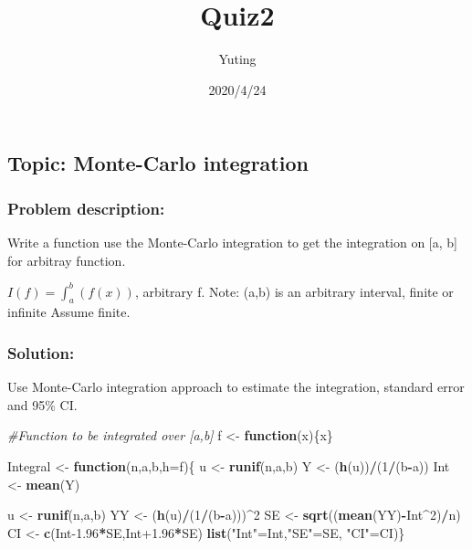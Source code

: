 \documentclass[
]{article}
\title{Quiz2}
\author{Yuting}
\date{2020/4/24}
\newenvironment{Shaded}{\begin{snugshade}}{\end{snugshade}}
\newcommand{\CommentTok}[1]{\textcolor[rgb]{0.56,0.35,0.01}{\textit{#1}}}
\newcommand{\ControlFlowTok}[1]{\textcolor[rgb]{0.13,0.29,0.53}{\textbf{#1}}}
\newcommand{\DataTypeTok}[1]{\textcolor[rgb]{0.13,0.29,0.53}{#1}}
\newcommand{\DecValTok}[1]{\textcolor[rgb]{0.00,0.00,0.81}{#1}}
\newcommand{\FloatTok}[1]{\textcolor[rgb]{0.00,0.00,0.81}{#1}}
\newcommand{\KeywordTok}[1]{\textcolor[rgb]{0.13,0.29,0.53}{\textbf{#1}}}
\newcommand{\NormalTok}[1]{#1}
\newcommand{\OperatorTok}[1]{\textcolor[rgb]{0.81,0.36,0.00}{\textbf{#1}}}
\newcommand{\StringTok}[1]{\textcolor[rgb]{0.31,0.60,0.02}{#1}}
\begin{document}
\maketitle

{
\setcounter{tocdepth}{2}
\tableofcontents
}
\hypertarget{topic-monte-carlo-integration}{%
\subsection{Topic: Monte-Carlo
integration}\label{topic-monte-carlo-integration}}

\hypertarget{problem-description}{%
\subsubsection{Problem description:}\label{problem-description}}

Write a function use the Monte-Carlo integration to get the integration
on {[}a, b{]} for arbitray function.

\(I(f)=\int_{a}^{b}(f(x))\), arbitrary f. Note: (a,b) is an arbitrary
interval, finite or infinite Assume finite.

\hypertarget{solution}{%
\subsubsection{Solution:}\label{solution}}

Use Monte-Carlo integration approach to estimate the integration,
standard error and 95\% CI.

\begin{Shaded}
\begin{Highlighting}[]
\CommentTok{#Function to be integrated over [a,b]}
\NormalTok{f <-}\StringTok{ }\ControlFlowTok{function}\NormalTok{(x)\{x\} }

\NormalTok{Integral <-}\StringTok{ }\ControlFlowTok{function}\NormalTok{(n,a,b,}\DataTypeTok{h=}\NormalTok{f)\{}
\NormalTok{u <-}\StringTok{ }\KeywordTok{runif}\NormalTok{(n,a,b) }
\NormalTok{Y <-}\StringTok{ }\NormalTok{(}\KeywordTok{h}\NormalTok{(u))}\OperatorTok{/}\NormalTok{(}\DecValTok{1}\OperatorTok{/}\NormalTok{(b}\OperatorTok{-}\NormalTok{a))}
\NormalTok{Int <-}\StringTok{ }\KeywordTok{mean}\NormalTok{(Y)}

\NormalTok{u <-}\StringTok{ }\KeywordTok{runif}\NormalTok{(n,a,b)}
\NormalTok{YY <-}\StringTok{ }\NormalTok{(}\KeywordTok{h}\NormalTok{(u)}\OperatorTok{/}\NormalTok{(}\DecValTok{1}\OperatorTok{/}\NormalTok{(b}\OperatorTok{-}\NormalTok{a)))}\OperatorTok{^}\DecValTok{2}
\NormalTok{SE <-}\StringTok{ }\KeywordTok{sqrt}\NormalTok{((}\KeywordTok{mean}\NormalTok{(YY)}\OperatorTok{-}\NormalTok{Int}\OperatorTok{^}\DecValTok{2}\NormalTok{)}\OperatorTok{/}\NormalTok{n)}
\NormalTok{CI <-}\StringTok{ }\KeywordTok{c}\NormalTok{(Int}\FloatTok{-1.96}\OperatorTok{*}\NormalTok{SE,Int}\FloatTok{+1.96}\OperatorTok{*}\NormalTok{SE)}
\KeywordTok{list}\NormalTok{(}\StringTok{"Int"}\NormalTok{=Int,}\StringTok{"SE"}\NormalTok{=SE, }\StringTok{"CI"}\NormalTok{=CI)\}}
\end{Highlighting}
\end{Shaded}
\end{document}
